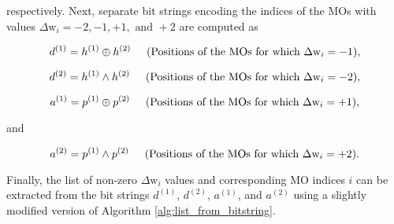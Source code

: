 \documentclass[12pt,a4paper]{report}
\begin{document}
\noindent
respectively. Next, separate bit strings encoding the indices of the
MOs with values $\Delta \text{w}_{i}=-2,-1,+1, \text{ and }+2$ are
computed as

\begin{equation}
  d^{(1)} = h^{(1)} \oplus h^{(2)} \hspace{0.5cm} \text{(Positions of
    the MOs for which $\Delta \text{w}_{i} = -1$)},
\end{equation}

\begin{equation}
  d^{(2)} = h^{(1)} \wedge h^{(2)} \hspace{0.5cm} \text{(Positions of
    the MOs for which $\Delta \text{w}_{i} = -2$)},
\end{equation}

\begin{equation}
  a^{(1)} = p^{(1)} \oplus p^{(2)} \hspace{0.5cm} \text{(Positions of
    the MOs for which $\Delta \text{w}_{i} = +1$)},
\end{equation}

\noindent
and

\begin{equation}
  a^{(2)} = p^{(1)} \wedge p^{(2)} \hspace{0.5cm} \text{(Positions of
    the MOs for which $\Delta \text{w}_{i} = +2$)}.
\end{equation}

Finally, the list of non-zero $\Delta \text{w}_{i}$ values and
corresponding MO indices $i$ can be extracted from the bit strings
$d^{(1)}$, $d^{(2)}$, $a^{(1)}$, and $a^{(2)}$ using a slightly
modified version of Algorithm \ref{alg:list_from_bitstring}.

\newpage
\clearpage
%
%

\clearpage
\lhead{\fancyplain{}{}} 

\end{document}
